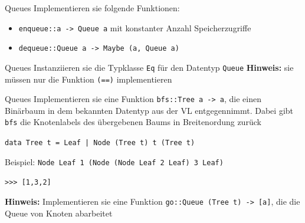 \documentclass{beamer}
\begin{document}
\begin{frame}{Queues}
    Implementieren sie folgende Funktionen:
    \begin{itemize}
        \item \texttt{enqueue::a -> Queue a} mit konstanter Anzahl Speicherzugriffe
        \item \texttt{dequeue::Queue a -> Maybe (a, Queue a)}
    \end{itemize}
\end{frame}

\begin{frame}{Queues}
    Instanziieren sie die Typklasse \texttt{Eq} für den Datentyp \texttt{Queue}
    \textbf{Hinweis:} sie müssen nur die Funktion \texttt{(==)} implementieren
\end{frame}

\begin{frame}{Queues}
    Implementieren sie eine Funktion \texttt{bfs::Tree a -> a}, die einen Binärbaum in dem bekannten Datentyp aus der VL entgegennimmt. Dabei gibt \texttt{bfs} die Knotenlabels des übergebenen Baums in Breitenordung zurück

    \texttt{data Tree t = Leaf | Node (Tree t) t (Tree t)}

    Beispiel: \texttt{Node Leaf 1 (Node (Node Leaf 2 Leaf) 3 Leaf)}

    \texttt{>>> [1,3,2]}

    \textbf{Hinweis:} Implementieren sie eine Funktion \texttt{go::Queue (Tree t) -> [a]}, die die Queue von Knoten abarbeitet
\end{frame}
\end{document}
